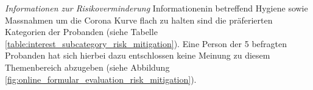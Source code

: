 \begin{table}[h]
\centering
{}
\caption{Ausgewählte Datenvisualisierungen pro Anwendungsfall für den Bereich ``Erklärung der Natur`` (Eigene Darstellung)}
\label{table:data_visualizations_explain_nature}
\end{table}

\noindent
\textit{Informationen zur Risikoverminderung}
\newline
\indent
Informationenin betreffend Hygiene sowie Massnahmen um die Corona Kurve flach zu halten sind die präferierten Kategorien der Probanden (siehe Tabelle \ref{table:interest_subcategory_risk_mitigation}). Eine Person der 5 befragten Probanden hat sich hierbei dazu entschlossen keine Meinung zu diesem Themenbereich abzugeben (siehe Abbildung \ref{fig:online_formular_evaluation_risk_mitigation}). 

